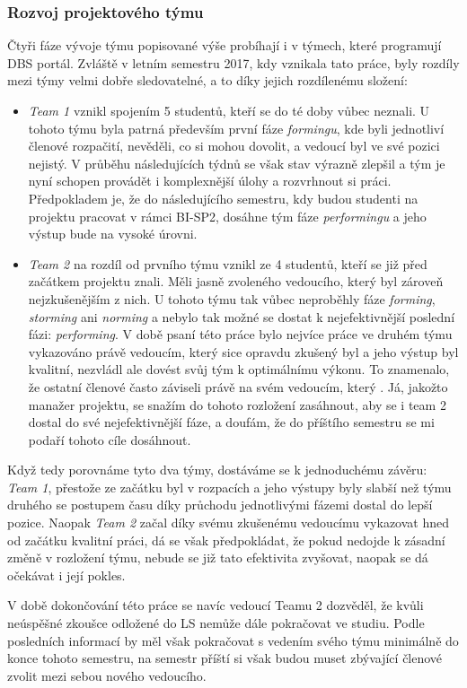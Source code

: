 \subsubsection{Rozvoj projektového týmu}
Čtyři fáze vývoje týmu popisované výše probíhají i v týmech, které programují DBS portál. Zvláště v letním semestru 2017, kdy vznikala tato práce, byly rozdíly mezi týmy velmi dobře sledovatelné, a to díky jejich rozdílenému složení:
\begin{itemize}
	\item \emph{Team 1} vznikl spojením 5 studentů, kteří se do té doby vůbec neznali. U tohoto týmu byla patrná především první fáze \emph{formingu}, kde byli jednotliví členové rozpačití, nevěděli, co si mohou dovolit, a vedoucí byl ve své pozici nejistý. V průběhu následujících týdnů se však stav výrazně zlepšil a tým je nyní schopen provádět i komplexnější úlohy a rozvrhnout si práci. Předpokladem je, že do následujícího semestru, kdy budou studenti na projektu pracovat v rámci BI-SP2, dosáhne tým fáze \emph{performingu} a jeho výstup bude na vysoké úrovni.
	\item \emph{Team 2} na rozdíl od prvního týmu vznikl ze 4 studentů, kteří se již před začátkem projektu znali. Měli jasně zvoleného vedoucího, který byl zároveň nejzkušenějším z nich. U tohoto týmu tak vůbec neproběhly fáze \emph{forming}, \emph{storming} ani \emph{norming} a nebylo tak možné se dostat k nejefektivnější poslední fázi: \emph{performing}. V době psaní této práce bylo nejvíce práce ve druhém týmu vykazováno právě vedoucím, který sice opravdu zkušený byl a jeho výstup byl kvalitní, nezvládl ale dovést svůj tým k optimálnímu výkonu. To znamenalo, že ostatní členové často záviseli právě na svém vedoucím, který . Já, jakožto manažer projektu, se snažím do tohoto rozložení zasáhnout, aby se i team 2 dostal do své nejefektivnější fáze, a doufám, že do příštího semestru se mi podaří tohoto cíle dosáhnout.
\end{itemize}
Když tedy porovnáme tyto dva týmy, dostáváme se k jednoduchému závěru: \emph{Team 1}, přestože ze začátku byl v rozpacích a jeho výstupy byly slabší než týmu druhého se postupem času díky průchodu jednotlivými fázemi dostal do lepší pozice. Naopak \emph{Team 2} začal díky svému zkušenému vedoucímu vykazovat hned od začátku kvalitní práci, dá se však předpokládat, že pokud nedojde k zásadní změně v rozložení týmu, nebude se již tato efektivita zvyšovat, naopak se dá očekávat i její pokles.

V době dokončování této práce se navíc vedoucí Teamu 2 dozvěděl, že kvůli neúspěšné zkoušce odložené do LS nemůže dále pokračovat ve studiu. Podle posledních informací by měl však pokračovat s vedením svého týmu minimálně do konce tohoto semestru, na semestr příští si však budou muset zbývající členové zvolit mezi sebou nového vedoucího.

